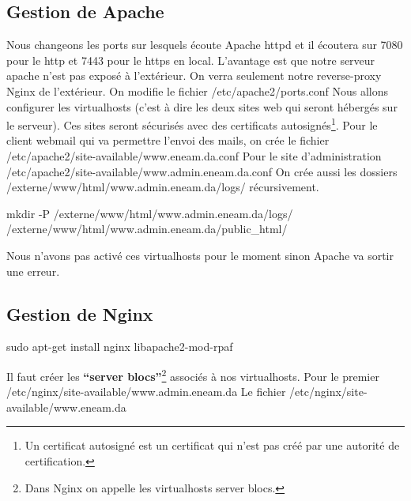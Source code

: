 \documentclass[a4paper,12pt,french]{report} %
\begin{document}
\subsection{Gestion de Apache}
Nous changeons les ports sur lesquels écoute Apache httpd et il écoutera sur 7080 pour le http et 7443 pour le https en local. L'avantage est que notre serveur apache n'est pas exposé à l'extérieur. On verra seulement notre reverse-proxy Nginx de l'extérieur. On modifie le fichier /etc/apache2/ports.conf
Nous allons configurer les virtualhosts (c'est à dire les deux sites web qui seront hébergés sur le serveur). Ces sites seront sécurisés avec des certificats autosignés\footnote{Un certificat autosigné est un certificat qui n'est pas créé par une autorité de certification.}.\label{ref:rainloop}
Pour le client webmail qui va permettre l'envoi des mails, on crée le fichier /etc/apache2/site-available/www.eneam.da.conf
Pour le site d'administration /etc/apache2/site-available/www.admin.eneam.da.conf
On crée aussi les dossiers /externe/www/html/www.admin.eneam.da/logs/ récursivement.
\begin{exempleConsole}
mkdir -P /externe/www/html/www.admin.eneam.da/logs/ /externe/www/html/www.admin.eneam.da/public_html/
\end{exempleConsole}
Nous n'avons pas activé ces virtualhosts pour le moment sinon Apache va sortir une erreur.
\subsection{Gestion de Nginx}
\begin{exempleConsole}
sudo apt-get install nginx libapache2-mod-rpaf
\end{exempleConsole}
Il faut créer les  \textbf{“server blocs”}\footnote{Dans Nginx on appelle les virtualhosts server blocs.} associés à nos virtualhosts. Pour le premier /etc/nginx/site-available/www.admin.eneam.da
Le fichier /etc/nginx/site-available/www.eneam.da
\end{document}
